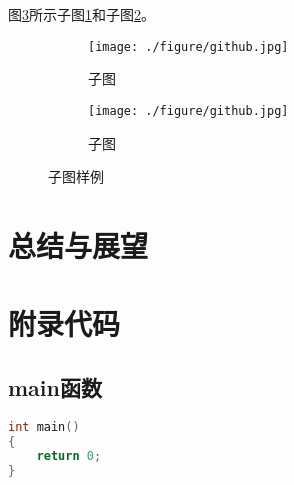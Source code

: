 \documentclass[winfonts,master,twoside]{njuthesis}
\begin{document}
图\ref{fig:sub}所示子图\ref{subfig:a}和子图\ref{subfig:b}。
\begin{figure}[H]
	\begin{subfigure}{.5\textwidth}
		\centering
		\texttt{[image: ./figure/github.jpg]}
		\caption{子图}
		\label{subfig:a}
	\end{subfigure}
	\begin{subfigure}{.5\textwidth}
		\centering
		\texttt{[image: ./figure/github.jpg]}
		\caption{子图}
		\label{subfig:b}
	\end{subfigure}
\caption{子图样例}
\label{fig:sub}
\end{figure}


\chapter{总结与展望}
\lipsum[1]


\begin{acknowledgement}
\lipsum[1]

\end{acknowledgement}






\appendix
\chapter{附录代码}\label{app:1}
\section{main函数}
\begin{lstlisting}[language=C]
int main()
{
	return 0;
}
\end{lstlisting}
\end{document}
